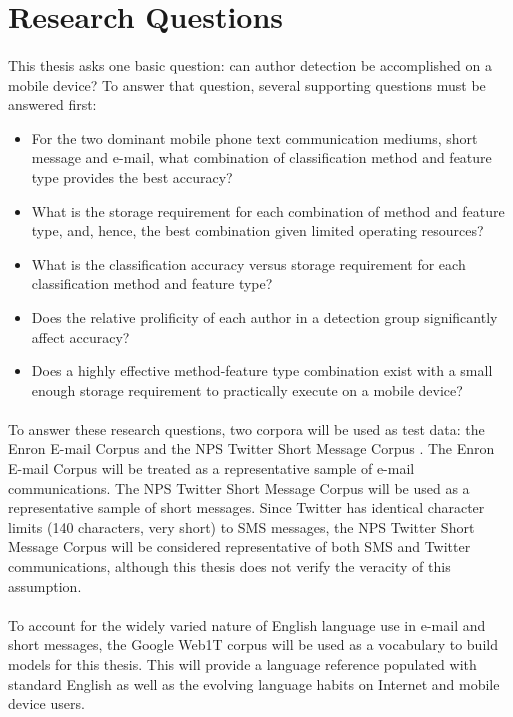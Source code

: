 \section{Research Questions}
\paragraph*{} This thesis asks one basic question: can author detection be accomplished on a mobile device?  To answer that question, several supporting questions must be answered first: 
\begin{itemize}
	\item For the two dominant mobile phone text communication mediums, short message and e-mail, what combination of classification method and feature type provides the best accuracy?
	\item What is the storage requirement for each combination of method and feature type, and, hence, the best combination given limited operating resources?
	\item What is the classification accuracy versus storage requirement for each classification method and feature type?
	\item Does the relative prolificity of each author in a detection group significantly affect accuracy?
	\item Does a highly effective method-feature type combination exist with a small enough storage requirement to practically execute on a mobile device?
\end{itemize}

\paragraph*{} To answer these research questions, two corpora will be used as test data: the Enron E-mail Corpus \cite{brants_web_2006} and the NPS Twitter Short Message Corpus \cite{boutwell_sarah_author_2011}.  The Enron E-mail Corpus will be treated as a representative sample of e-mail communications.  The NPS Twitter Short Message Corpus will be used as a representative sample of short messages.  Since Twitter has identical character limits (140 characters, very short) to SMS messages, the NPS Twitter Short Message Corpus will be considered representative of both SMS and Twitter communications, although this thesis does not verify the veracity of this assumption.

\paragraph*{} To account for the widely varied nature of English language use in e-mail and short messages, the Google Web1T corpus \cite{brants_web_2006} will be used as a vocabulary to build models for this thesis.  This will provide a language reference populated with standard English as well as the evolving language habits on Internet and mobile device users.


